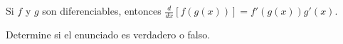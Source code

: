\item Si $f$ y $g$ son diferenciables, entonces $\frac{d}{dx} [f(g(x))] = f'(g(x))g'(x)$.
\par
Determine si el enunciado es verdadero o falso.
